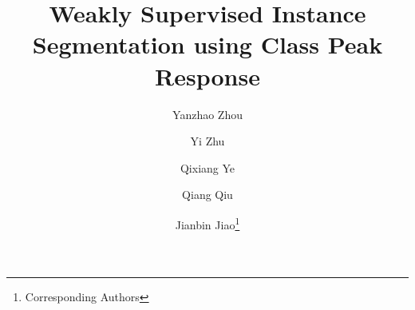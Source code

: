 \documentclass[10pt,twocolumn,letterpaper]{article}
\begin{document}
\makeatletter
\renewcommand*{\@fnsymbol}[1]{\dag}
\makeatother

\title{Weakly Supervised Instance Segmentation using Class Peak Response}

\author[1]{Yanzhao Zhou}
\author[1]{Yi Zhu}
\author[1]{Qixiang Ye}
\author[2]{Qiang Qiu}
\author[1]{Jianbin Jiao\thanks{Corresponding Authors}}


\renewcommand\Authands{ and }

\maketitle
















\clearpage

{\small


}
\end{document}
